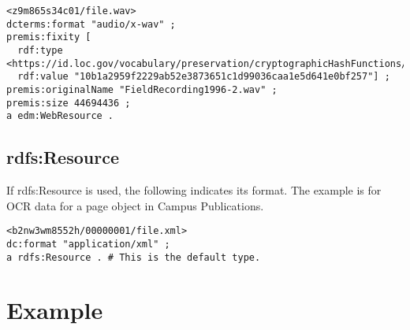 \documentclass[11pt]{article}
\begin{document}
\begin{verbatim}
<z9m865s34c01/file.wav> 
dcterms:format "audio/x-wav" ;
premis:fixity [
  rdf:type <https://id.loc.gov/vocabulary/preservation/cryptographicHashFunctions/sha512>;
  rdf:value "10b1a2959f2229ab52e3873651c1d99036caa1e5d641e0bf257"] ;
premis:originalName "FieldRecording1996-2.wav" ;
premis:size 44694436 ;
a edm:WebResource .
\end{verbatim}

\subsection{rdfs:Resource}

If rdfs:Resource is used, the following indicates its format. The example is for OCR data for a page object in Campus Publications.

\begin{verbatim}
<b2nw3wm8552h/00000001/file.xml>
dc:format "application/xml" ;
a rdfs:Resource . # This is the default type. 
\end{verbatim}

\pagebreak[4]
\section{Example}

\end{document}
